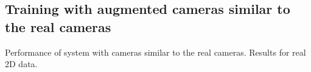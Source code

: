 
\subsection{Training with augmented cameras similar to the real cameras}
Performance of system with cameras similar to the real cameras.
Results for real 2D data.